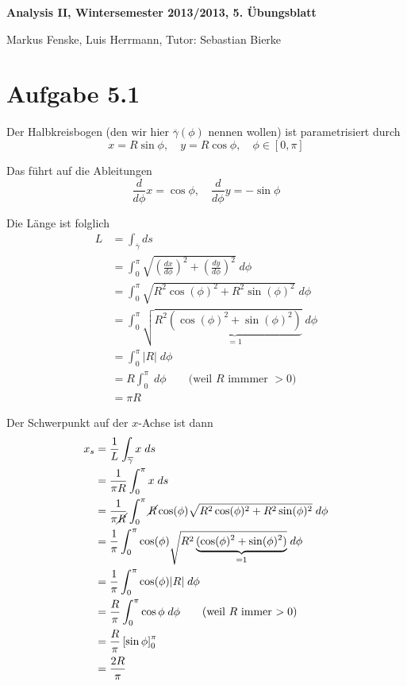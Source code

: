 \documentclass[a4paper,german,12pt,smallheadings]{scrartcl}
\begin{document}
\begin{center}
\bfseries %
\sffamily %
\vspace{-40pt}
Analysis II, Wintersemester 2013/2013, 5. Übungsblatt

Markus Fenske, Luis Herrmann, Tutor: Sebastian Bierke
\vspace{-10pt}
\end{center}
\allowdisplaybreaks %
\section*{Aufgabe 5.1}
Der Halbkreisbogen (den wir hier $\overline{\gamma}(\phi)$ nennen wollen) ist
parametrisiert durch
\begin{equation*}
  x = R \sin \phi,\quad y = R \cos \phi, \quad \phi \in [0, \pi]
\end{equation*}

Das führt auf die Ableitungen
\begin{equation*}
  \frac{d}{d \phi} x= \cos \phi,\quad \frac{d}{d \phi} y = -\sin \phi
\end{equation*}

Die Länge ist folglich
\begin{align*}
  L &= \int_{\overline{\gamma}} ds \\ 
    &= \int_0^\pi \sqrt{\left(\frac{dx}{d\phi}\right)^2 + \left(\frac{dy}{d \phi}\right)^2} \; d\phi \\
    &= \int_0^\pi \sqrt{R^2 \cos(\phi)^2 + R^2 \sin(\phi)^2} \; d\phi \\
    &= \int_0^\pi \sqrt{R^2 \underbrace{(\cos(\phi)^2 + \sin(\phi)^2)}_{=1}} \; d\phi \\
    &= \int_0^\pi |R| \; d\phi \\
    &= R \int_0^\pi \; d\phi \qquad \text{(weil $R$ immmer $>0$)} \\
    &= \pi R
\end{align*}

Der Schwerpunkt auf der $x$-Achse ist dann
\begin{align*}
  x_s &= \frac{1}{L} \int_{\overline{\gamma}} x \; ds \\
      &= \frac{1}{\pi R} \int_0^\pi x \; ds \\
      &= \frac{1}{\pi \cancel{R}} \int_0^\pi \cancel{R} \cos(\phi) \sqrt{R^2 \cos(\phi)^2 + R^2 \sin(\phi)^2} \; d\phi \\
      &= \frac{1}{\pi} \int_0^\pi \cos(\phi) \sqrt{R^2 \underbrace{(\cos(\phi)^2 + \sin(\phi)^2)}_{=1}} \; d\phi \\
      &= \frac{1}{\pi} \int_0^\pi \cos(\phi) |R| \; d\phi \\
      &= \frac{R}{\pi} \int_0^\pi \cos \phi  \; d\phi \qquad \text{(weil $R$ immer $>0$)}\\
      &= \frac{R}{\pi} \left[ \sin \phi\right]_0^\pi \\
      &= \frac{2R}{\pi}
\end{align*}
\end{document}
